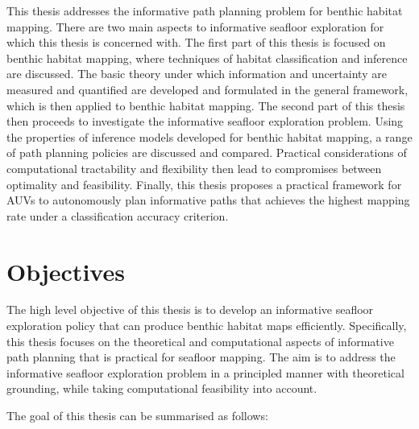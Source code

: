 		This thesis addresses the informative path planning problem for benthic habitat mapping. There are two main aspects to informative seafloor exploration for which this thesis is concerned with. The first part of this thesis is focused on benthic habitat mapping, where techniques of habitat classification and inference are discussed. The basic theory under which information and uncertainty are measured and quantified are developed and formulated in the general framework, which is then applied to benthic habitat mapping. The second part of this thesis then proceeds to investigate the informative seafloor exploration problem. Using the properties of inference models developed for benthic habitat mapping, a range of path planning policies are discussed and compared. Practical considerations of computational tractability and flexibility then lead to compromises between optimality and feasibility. Finally, this thesis proposes a practical framework for AUVs to autonomously plan informative paths that achieves the highest mapping rate under a classification accuracy criterion.
		
\section{Objectives}

	The high level objective of this thesis is to develop an informative seafloor exploration policy that can produce benthic habitat maps efficiently. Specifically, this thesis focuses on the theoretical and computational aspects of informative path planning that is practical for seafloor mapping. The aim is to address the informative seafloor exploration problem in a principled manner with theoretical grounding, while taking computational feasibility into account. 
	
	The goal of this thesis can be summarised as follows:
	
